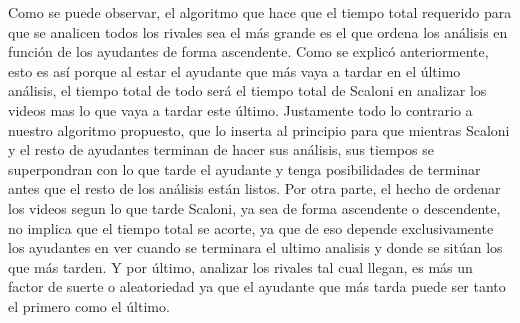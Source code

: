 Como se puede observar, el algoritmo que hace que el tiempo total requerido para que se analicen todos los rivales sea el más grande es el que ordena los análisis en función de los ayudantes de forma ascendente. Como se explicó anteriormente, esto es así porque al estar el ayudante que más vaya a tardar en el último análisis, el tiempo total de todo será el tiempo total de Scaloni en analizar los videos mas lo que vaya a tardar este último. Justamente todo lo contrario a nuestro algoritmo propuesto, que lo inserta al principio para que mientras Scaloni y el resto de ayudantes terminan de hacer sus análisis, sus tiempos se superpondran con lo que tarde el ayudante y tenga posibilidades de terminar antes que el resto de los análisis están listos.
Por otra parte, el hecho de ordenar los videos segun lo que tarde Scaloni, ya sea de forma ascendente o descendente, no implica que el tiempo total se acorte, ya que de eso depende exclusivamente los ayudantes en ver cuando se terminara el ultimo analisis y donde se sitúan los que más tarden.
Y por último, analizar los rivales tal cual llegan, es más un factor de suerte o aleatoriedad ya que el ayudante que más tarda puede ser tanto el primero como el último.
